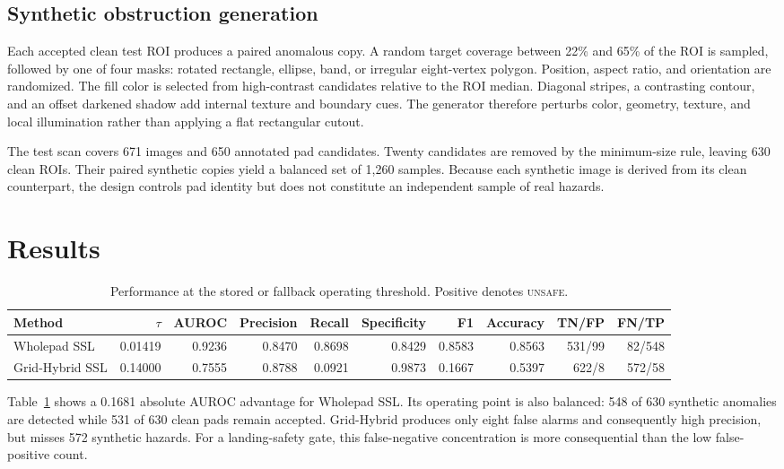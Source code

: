 \subsection{Synthetic obstruction generation}
Each accepted clean test ROI produces a paired anomalous copy. A random target coverage between 22\% and 65\% of the ROI is sampled, followed by one of four masks: rotated rectangle, ellipse, band, or irregular eight-vertex polygon. Position, aspect ratio, and orientation are randomized. The fill color is selected from high-contrast candidates relative to the ROI median. Diagonal stripes, a contrasting contour, and an offset darkened shadow add internal texture and boundary cues. The generator therefore perturbs color, geometry, texture, and local illumination rather than applying a flat rectangular cutout.

The test scan covers 671 images and 650 annotated pad candidates. Twenty candidates are removed by the minimum-size rule, leaving 630 clean ROIs. Their paired synthetic copies yield a balanced set of 1,260 samples. Because each synthetic image is derived from its clean counterpart, the design controls pad identity but does not constitute an independent sample of real hazards.

\section{Results}
\begin{table}[t]
\centering
\caption{Performance at the stored or fallback operating threshold. Positive denotes \textsc{unsafe}.}
\label{tab:main}
\small
\begin{tabular}{lrrrrrrrrr}
\toprule
Method & $\tau$ & AUROC & Precision & Recall & Specificity & F1 & Accuracy & TN/FP & FN/TP \\
\midrule
Wholepad SSL & 0.01419 & 0.9236 & 0.8470 & 0.8698 & 0.8429 & 0.8583 & 0.8563 & 531/99 & 82/548 \\
Grid-Hybrid SSL & 0.14000 & 0.7555 & 0.8788 & 0.0921 & 0.9873 & 0.1667 & 0.5397 & 622/8 & 572/58 \\
\bottomrule
\end{tabular}
\end{table}

Table~\ref{tab:main} shows a 0.1681 absolute AUROC advantage for Wholepad SSL. Its operating point is also balanced: 548 of 630 synthetic anomalies are detected while 531 of 630 clean pads remain accepted. Grid-Hybrid produces only eight false alarms and consequently high precision, but misses 572 synthetic hazards. For a landing-safety gate, this false-negative concentration is more consequential than the low false-positive count.

